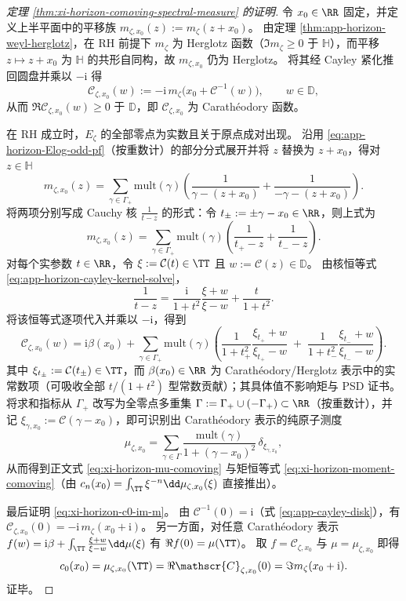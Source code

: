 \begin{proof}[定理 \ref{thm:xi-horizon-comoving-spectral-measure} 的证明]
令 \(x_0\in\RR\) 固定，并定义上半平面中的平移族
\(
m_{\zeta,x_0}(z):=m_{\zeta}(z+x_0)
\)。
由定理 \ref{thm:app-horizon-weyl-herglotz}，在 RH 前提下 \(m_{\zeta}\) 为 Herglotz 函数（\(\Im m_{\zeta}\ge 0\) 于 \(\mathbb{H}\)），而平移 \(z\mapsto z+x_0\) 为 \(\mathbb{H}\) 的共形自同构，故 \(m_{\zeta,x_0}\) 仍为 Herglotz。
将其经 Cayley 紧化推回圆盘并乘以 \(-\mathrm{i}\) 得
\[
\mathscr{C}_{\zeta,x_0}(w):=-\mathrm{i}\,m_{\zeta}\!\bigl(x_0+\mathcal{C}^{-1}(w)\bigr),
\qquad w\in\mathbb{D},
\]
从而 \(\Re \mathscr{C}_{\zeta,x_0}(w)\ge 0\) 于 \(\mathbb{D}\)，即 \(\mathscr{C}_{\zeta,x_0}\) 为 Carath\'eodory 函数。
\par
在 RH 成立时，\(E_{\zeta}\) 的全部零点为实数且关于原点成对出现。
沿用 \eqref{eq:app-horizon-Elog-odd-pf}（按重数计）的部分分式展开并将 \(z\) 替换为 \(z+x_0\)，得对 \(z\in\mathbb{H}\)
\[
m_{\zeta,x_0}(z)
=
\sum_{\gamma\in\Gamma_+}\mathrm{mult}(\gamma)\!\left(\frac{1}{\gamma-(z+x_0)}+\frac{1}{-\gamma-(z+x_0)}\right).
\]
将两项分别写成 Cauchy 核 \(\frac{1}{t-z}\) 的形式：令
\(
t_{\pm}:=\pm\gamma-x_0\in\RR
\)，则上式为
\[
m_{\zeta,x_0}(z)
=
\sum_{\gamma\in\Gamma_+}\mathrm{mult}(\gamma)\!\left(\frac{1}{t_+-z}+\frac{1}{t_--z}\right).
\]
对每个实参数 \(t\in\RR\)，令 \(\xi:=\mathcal{C}(t)\in\TT\) 且 \(w:=\mathcal{C}(z)\in\mathbb{D}\)。
由核恒等式 \eqref{eq:app-horizon-cayley-kernel-solve}，
\[
\frac{1}{t-z}
=\frac{\mathrm{i}}{1+t^{2}}\frac{\xi+w}{\xi-w}+\frac{t}{1+t^{2}}.
\]
将该恒等式逐项代入并乘以 \(-\mathrm{i}\)，得到
\[
\mathscr{C}_{\zeta,x_0}(w)
=\mathrm{i}\beta(x_0)
+\sum_{\gamma\in\Gamma_+}\mathrm{mult}(\gamma)
\left(
\frac{1}{1+t_+^2}\frac{\xi_{t_+}+w}{\xi_{t_+}-w}
\;+\;
\frac{1}{1+t_-^2}\frac{\xi_{t_-}+w}{\xi_{t_-}-w}
\right).
\]
其中 \(\xi_{t_\pm}:=\mathcal{C}(t_\pm)\in\TT\)，而 \(\beta(x_0)\in\RR\) 为 Carath\'eodory/Herglotz 表示中的实常数项（可吸收全部 \(t/(1+t^2)\) 型常数贡献）；其具体值不影响矩与 PSD 证书。
将求和指标从 \(\Gamma_+\) 改写为全零点多重集 \(\Gamma:=\Gamma_+\cup(-\Gamma_+)\subset\RR\)（按重数计），并记
\(
\xi_{\gamma,x_0}:=\mathcal{C}(\gamma-x_0)
\)，即可识别出 Carath\'eodory 表示的纯原子测度
\[
\mu_{\zeta,x_0}
=
\sum_{\gamma\in\Gamma}\frac{\mathrm{mult}(\gamma)}{1+(\gamma-x_0)^2}\,\delta_{\xi_{\gamma,x_0}},
\]
从而得到正文式 \eqref{eq:xi-horizon-mu-comoving} 与矩恒等式 \eqref{eq:xi-horizon-moment-comoving}（由 \(c_n(x_0)=\int_{\TT}\xi^{-n}\dd\mu_{\zeta,x_0}(\xi)\) 直接推出）。
\par
最后证明 \eqref{eq:xi-horizon-c0-im-m}。
由 \(\mathcal{C}^{-1}(0)=\mathrm{i}\)（式 \eqref{eq:app-cayley-disk}），有
\(
\mathscr{C}_{\zeta,x_0}(0)=-\mathrm{i}\,m_{\zeta}(x_0+\mathrm{i})
\)。
另一方面，对任意 Carath\'eodory 表示 \(f(w)=\mathrm{i}\beta+\int_{\TT}\frac{\xi+w}{\xi-w}\dd\mu(\xi)\) 有
\(
\Re f(0)=\mu(\TT)
\)。
取 \(f=\mathscr{C}_{\zeta,x_0}\) 与 \(\mu=\mu_{\zeta,x_0}\) 即得
\[
c_0(x_0)=\mu_{\zeta,x_0}(\TT)=\Re \mathscr{C}_{\zeta,x_0}(0)=\Im m_{\zeta}(x_0+\mathrm{i}).
\]
证毕。
\end{proof}

